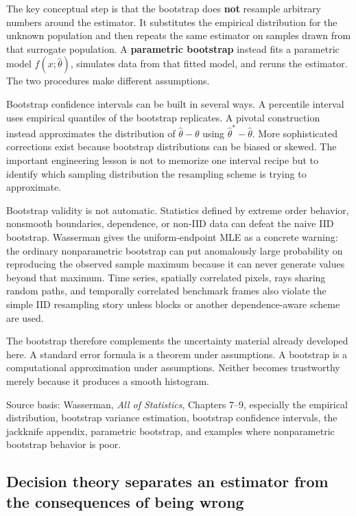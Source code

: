 The key conceptual step is that the bootstrap does \textbf{not} resample arbitrary numbers around the estimator. It substitutes the empirical distribution for the unknown population and then repeats the same estimator on samples drawn from that surrogate population. A \textbf{parametric bootstrap} instead fits a parametric model \(f(x;\hat\theta)\), simulates data from that fitted model, and reruns the estimator. The two procedures make different assumptions.

Bootstrap confidence intervals can be built in several ways. A percentile interval uses empirical quantiles of the bootstrap replicates. A pivotal construction instead approximates the distribution of \(\hat\theta-\theta\) using \(\hat\theta^*-\hat\theta\). More sophisticated corrections exist because bootstrap distributions can be biased or skewed. The important engineering lesson is not to memorize one interval recipe but to identify which sampling distribution the resampling scheme is trying to approximate.

Bootstrap validity is not automatic. Statistics defined by extreme order behavior, nonsmooth boundaries, dependence, or non-IID data can defeat the naive IID bootstrap. Wasserman gives the uniform-endpoint MLE as a concrete warning: the ordinary nonparametric bootstrap can put anomalously large probability on reproducing the observed sample maximum because it can never generate values beyond that maximum. Time series, spatially correlated pixels, rays sharing random paths, and temporally correlated benchmark frames also violate the simple IID resampling story unless blocks or another dependence-aware scheme are used.

The bootstrap therefore complements the uncertainty material already developed here. A standard error formula is a theorem under assumptions. A bootstrap is a computational approximation under assumptions. Neither becomes trustworthy merely because it produces a smooth histogram.

Source basis: Wasserman, \emph{All of Statistics}, Chapters 7--9, especially the empirical distribution, bootstrap variance estimation, bootstrap confidence intervals, the jackknife appendix, parametric bootstrap, and examples where nonparametric bootstrap behavior is poor.

\subsection{Decision theory separates an estimator from the consequences of being wrong}\label{02-foundations-ii-ch030-decision-theory-separates-an-estimator-from-the-consequences-of-being-wrong}

